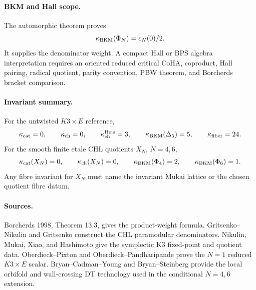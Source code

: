 \paragraph{BKM and Hall scope.}
The automorphic theorem proves
\[
  \kappa_{\mathrm{BKM}}(\Phi_N)=c_N(0)/2.
\]
It supplies the denominator weight.  A compact Hall or BPS algebra
interpretation requires an oriented reduced critical CoHA, coproduct,
Hall pairing, radical quotient, parity convention, PBW theorem, and
Borcherds bracket comparison.

\paragraph{Invariant summary.}
For the untwisted \(K3\times E\) reference,
\[
  \kappa_{\mathrm{cat}}=0,\qquad
  \kappa_{\mathrm{ch}}=0,\qquad
  \kappa_{\mathrm{ch}}^{\mathrm{Heis}}=3,\qquad
  \kappa_{\mathrm{BKM}}(\Delta_5)=5,\qquad
  \kappa_{\mathrm{fiber}}=24.
\]
For the smooth finite etale CHL quotients \(X_N\), \(N=4,6\),
\[
  \kappa_{\mathrm{cat}}(X_N)=0,\qquad
  \kappa_{\mathrm{ch}}(X_N)=0,\qquad
  \kappa_{\mathrm{BKM}}(\Phi_4)=2,\qquad
  \kappa_{\mathrm{BKM}}(\Phi_6)=1.
\]
Any fibre invariant for \(X_N\) must name the invariant Mukai lattice or
the chosen quotient fibre datum.

\paragraph{Sources.}
Borcherds 1998, Theorem 13.3, gives the product-weight formula.
Gritsenko--Nikulin and Gritsenko construct the CHL paramodular
denominators.  Nikulin, Mukai, Xiao, and Hashimoto give the symplectic
K3 fixed-point and quotient data.  Oberdieck--Pixton and
Oberdieck--Pandharipande prove the \(N=1\) reduced \(K3\times E\)
scalar.  Bryan--Cadman--Young and Bryan--Steinberg provide the local
orbifold and wall-crossing DT technology used in the conditional
\(N=4,6\) extension.
